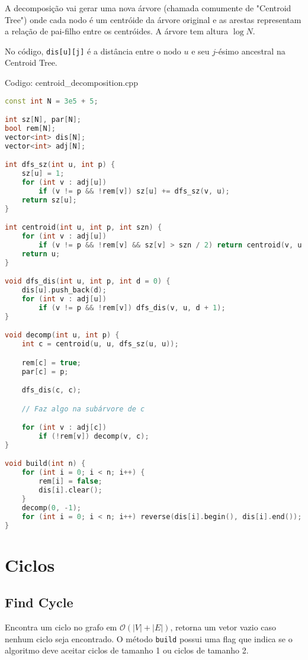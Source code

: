 \documentclass[10pt, a4paper, oneside]{book}
\begin{document}
A decomposição vai gerar uma nova árvore (chamada comumente de "Centroid Tree") onde cada nodo é um centróide da árvore original e as arestas representam a relação de pai-filho entre os centróides. A árvore tem altura $\log N$.



No código, \texttt{dis[u][j]} é a distância entre o nodo $u$ e seu $j$-ésimo ancestral na Centroid Tree.

\hfill

Codigo: centroid\_decomposition.cpp

\begin{lstlisting}[language=C++]
const int N = 3e5 + 5;

int sz[N], par[N];
bool rem[N];
vector<int> dis[N];
vector<int> adj[N];

int dfs_sz(int u, int p) {
    sz[u] = 1;
    for (int v : adj[u])
        if (v != p && !rem[v]) sz[u] += dfs_sz(v, u);
    return sz[u];
}

int centroid(int u, int p, int szn) {
    for (int v : adj[u])
        if (v != p && !rem[v] && sz[v] > szn / 2) return centroid(v, u, szn);
    return u;
}

void dfs_dis(int u, int p, int d = 0) {
    dis[u].push_back(d);
    for (int v : adj[u])
        if (v != p && !rem[v]) dfs_dis(v, u, d + 1);
}

void decomp(int u, int p) {
    int c = centroid(u, u, dfs_sz(u, u));

    rem[c] = true;
    par[c] = p;

    dfs_dis(c, c);

    // Faz algo na subárvore de c

    for (int v : adj[c])
        if (!rem[v]) decomp(v, c);
}

void build(int n) {
    for (int i = 0; i < n; i++) {
        rem[i] = false;
        dis[i].clear();
    }
    decomp(0, -1);
    for (int i = 0; i < n; i++) reverse(dis[i].begin(), dis[i].end());
}\end{lstlisting}
\hfill

\section{Ciclos}
\subsection{Find Cycle}


Encontra um ciclo no grafo em $\mathcal{O}(|V| + |E|)$, retorna um vetor vazio caso nenhum ciclo seja encontrado. O método \texttt{build} possui uma flag que indica se o algoritmo deve aceitar ciclos de tamanho 1 ou ciclos de tamanho 2.
\hfill
\end{document}
